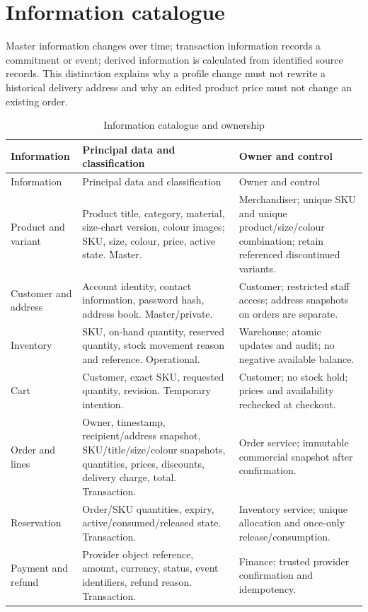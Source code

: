 \section{Information catalogue}
Master information changes over time; transaction information records a commitment or event; derived information is calculated from identified source records. This distinction explains why a profile change must not rewrite a historical delivery address and why an edited product price must not change an existing order.
\begin{longtable}{P{.18\linewidth}P{.37\linewidth}P{.36\linewidth}}
\caption{Information catalogue and ownership}\label{tab:information}\\
\toprule Information & Principal data and classification & Owner and control \\\midrule\endfirsthead
\toprule Information & Principal data and classification & Owner and control \\\midrule\endhead
Product and variant & Product title, category, material, size-chart version, colour images; SKU, size, colour, price, active state. Master. & Merchandiser; unique SKU and unique product/size/colour combination; retain referenced discontinued variants.\\
Customer and address & Account identity, contact information, password hash, address book. Master/private. & Customer; restricted staff access; address snapshots on orders are separate.\\
Inventory & SKU, on-hand quantity, reserved quantity, stock movement reason and reference. Operational. & Warehouse; atomic updates and audit; no negative available balance.\\
Cart & Customer, exact SKU, requested quantity, revision. Temporary intention. & Customer; no stock hold; prices and availability rechecked at checkout.\\
Order and lines & Owner, timestamp, recipient/address snapshot, SKU/title/size/colour snapshots, quantities, prices, discounts, delivery charge, total. Transaction. & Order service; immutable commercial snapshot after confirmation.\\
Reservation & Order/SKU quantities, expiry, active/consumed/released state. Transaction. & Inventory service; unique allocation and once-only release/consumption.\\
Payment and refund & Provider object reference, amount, currency, status, event identifiers, refund reason. Transaction. & Finance; trusted provider confirmation and idempotency.\\

\end{longtable}
